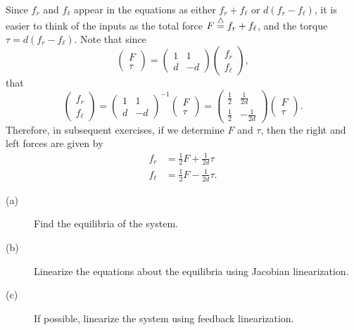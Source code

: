 Since $f_r$ and $f_\ell$ appear in the equations as either $f_r+f_\ell$ or $d(f_r-f_\ell)$, it is easier to think of the inputs as the total force $F\stackrel{\triangle}{=} f_r+f_\ell$, and the torque $\tau=d(f_r-f_\ell)$.  Note that since
\[
\begin{pmatrix} F \\ \tau \end{pmatrix} = \begin{pmatrix} 1 & 1 \\ d & -d \end{pmatrix}\begin{pmatrix} f_r \\ f_\ell \end{pmatrix},
\]
that
\[
\begin{pmatrix} f_r \\ f_\ell \end{pmatrix} = \begin{pmatrix} 1 & 1 \\ d & -d \end{pmatrix}^{-1}\begin{pmatrix} F \\ \tau \end{pmatrix}
= \begin{pmatrix} \frac{1}{2} & \frac{1}{2d} \\ \frac{1}{2} & -\frac{1}{2d} \end{pmatrix} \begin{pmatrix} F \\ \tau \end{pmatrix}.
\]
Therefore, in subsequent exercises, if we determine $F$ and $\tau$, then the right and left forces are given by
\begin{align*}
f_r &= \frac{1}{2} F + \frac{1}{2d}\tau \\
f_\ell &= \frac{1}{2}F - \frac{1}{2d}\tau.
\end{align*}
    \begin{description}
    \item[(a)] Find the equilibria of the system.
    \item[(b)] Linearize the equations about the equilibria using Jacobian linearization.    
    \item[(c)] If possible, linearize the system using feedback linearization.
    \end{description}

